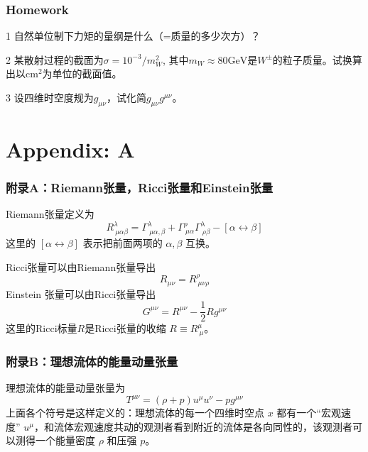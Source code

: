 \documentclass[CJK,13pt]{beamer}
\begin{document}
\begin{frame}
  \frametitle{Homework}
  \bitem
\item[1]{自然单位制下力矩的量纲是什么（=质量的多少次方）？}
\item[2]{某散射过程的截面为$\sigma = 10^{-3}/m_W^2$, 其中$m_W \approx 80 \mathrm{GeV}$是$W^{\pm}$的粒子质量。试换算出以$\mathrm{cm}^2$为单位的截面值。}
\item[3]{设四维时空度规为$g_{\mu\nu}$，试化简$g_{\mu\nu}g^{\mu\nu}$。}
  \eitem
  
\end{frame}

\section{Appendix: A}

\begin{frame}
  \frametitle{附录A：Riemann张量，Ricci张量和Einstein张量}
  Riemann张量定义为
  $$R^\lambda_{\ \mu\alpha\beta} = \Gamma^\lambda_{\ \mu\alpha,\beta} + \Gamma^\rho_{\ \mu\alpha}\Gamma^\lambda_{\ \rho\beta} -[\alpha \leftrightarrow\beta]$$
  这里的 $[\alpha \leftrightarrow\beta]$ 表示把前面两项的 $\alpha,\beta$ 互换。

  Ricci张量可以由Riemann张量导出
  $$  R_{\mu\nu} = R^\rho_{\ \mu\nu\rho}$$
  Einstein 张量可以由Ricci张量导出
  $$ G^{\mu\nu} = R^{\mu\nu}-\frac{1}{2}R g^{\mu\nu}$$
  这里的Ricci标量$R$是Ricci张量的收缩 $R\equiv R^\mu_{\ \mu}$。
\end{frame}


\begin{frame}
  \frametitle{附录B：理想流体的能量动量张量}
  理想流体的能量动量张量为
  $$ T^{\mu\nu} = (\rho+p)u^\mu u^\nu - p g^{\mu\nu}$$
  上面各个符号是这样定义的：理想流体的每一个四维时空点 $x$ 都有一个“宏观速度” $u^\mu$，和流体宏观速度共动的观测者看到附近的流体是各向同性的，该观测者可以测得一个能量密度 $\rho$ 和压强 $p$。
\end{frame}


\ech
\end{document}

